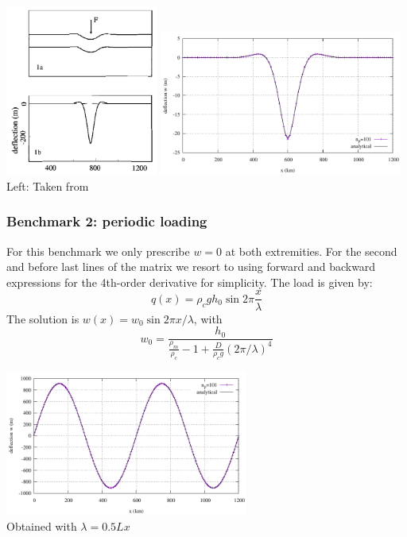 \begin{center}
\includegraphics[width=5cm]{python_codes/fieldstone_105/images/buiter}
\includegraphics[width=8cm]{python_codes/fieldstone_105/results/bench1/w.pdf}\\
{\captionfont Left: Taken from \cite{buiter_thesis}}
\end{center}


\subsubsection*{Benchmark 2: periodic loading}

For this benchmark we only prescribe $w=0$ at both extremities.
For the second and before last lines of the matrix we resort to 
using forward and backward expressions for the 4th-order 
derivative for simplicity.
The load is given by:
\[
q(x)=\rho_c g h_0 \sin 2\pi \frac{x}{\lambda}
\]
The solution is $w(x)=w_0 \sin 2\pi x/\lambda$, with 
\[
w_0=\frac{h_0}{\frac{\rho_m}{\rho_c}-1+\frac{D}{\rho_c g} (2\pi/\lambda)^4}
\]

\begin{center}
\includegraphics[width=8cm]{python_codes/fieldstone_105/results/bench2/w.pdf}\\
{\captionfont Obtained with $\lambda=0.5Lx$}
\end{center}

